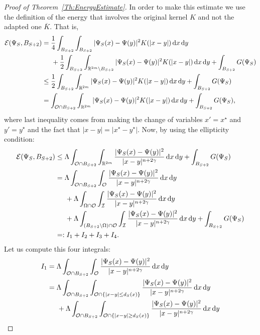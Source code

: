 \begin{proof}[Proof of Theorem~\ref{Th:EnergyEstimate}]
In order to make this estimate we use the definition of the energy that involves the original kernel $K$ and not the adapted one $\overline{K}$. That is,
\begin{align*}
\mathcal{E}(\Psi_S,B_{S+2}) &= \frac{1}{4} \int_{B_{S+2}} \int_{B_{S+2}} |\Psi_S(x)-\Psi(y)|^2K(|x-y|) \,\mathrm{d} x\,\mathrm{d} y \\
&\hspace{5mm} +\frac{1}{2} \int_{B_{S+2}} \int_{\mathbb{R}^{2m} \setminus B_{S+2}} |\Psi_S(x)-\Psi(y)|^2K(|x-y|) \,\mathrm{d} x\,\mathrm{d} y + \int_{B_{S+2}} G(\Psi_S) \\
&\leq \frac{1}{2} \int_{B_{S+2}} \int_{\mathbb{R}^{2m}} |\Psi_S(x)-\Psi(y)|^2K(|x-y|) \,\mathrm{d} x\,\mathrm{d} y + \int_{B_{S+2}} G(\Psi_S) \\
&= \int_{\mathcal{O} \cap B_{S+2}} \int_{\mathbb{R}^{2m}} |\Psi_S(x)-\Psi(y)|^2K(|x-y|) \,\mathrm{d} x\,\mathrm{d} y + \int_{B_{S+2}} G(\Psi_S),
\end{align*}
where last inequality comes from making the change of variables $x'=x^\star$ and $y'=y^\star$ and the fact that $|x-y|=|x^\star-y^\star|$. Now, by using the ellipticity condition:
\begin{align*}
\mathcal{E}(\Psi_S,B_{S+2}) &\leq \Lambda \int_{\mathcal{O} \cap B_{S+2}} \int_{\mathbb{R}^{2m}} \frac{|\Psi_S(x)-\Psi(y)|^2}{|x-y|^{n+2\gamma}} \,\mathrm{d} x\,\mathrm{d} y + \int_{B_{S+2}} G(\Psi_S)\\
&= \Lambda \int_{\mathcal{O} \cap B_{S+2}} \int_{\mathcal{O}} \frac{|\Psi_S(x)-\Psi(y)|^2}{|x-y|^{n+2\gamma}} \,\mathrm{d} x\,\mathrm{d} y \\
&\hspace{5mm} + \Lambda \int_{\Omega \cap \mathcal{O}} \int_{\mathcal{I}} \frac{|\Psi_S(x)-\Psi(y)|^2}{|x-y|^{n+2\gamma}} \,\mathrm{d} x\,\mathrm{d} y \\
&\hspace{5mm} + \Lambda \int_{(B_{S+2}\setminus \Omega) \cap \mathcal{O}} \int_{\mathcal{I}} \frac{|\Psi_S(x)-\Psi(y)|^2}{|x-y|^{n+2\gamma}} \,\mathrm{d} x\,\mathrm{d} y + \int_{B_{S+2}} G(\Psi_S) \\
&=:I_1+I_2+I_3+I_4.
\end{align*}
Let us compute this four integrals:
\begin{align*}
I_1 &= \Lambda \int_{\ocal \cap B_{S+2}} \int_{\ocal} \frac{|\Psi_S(x)-\Psi(y)|^2}{|x-y|^{n+2\s}} \d x\d y\\
&= \Lambda \int_{\ocal \cap B_{S+2}} \int_{\ocal\cap\{|x-y|\leq d_S(x)\}} \frac{|\Psi_S(x)-\Psi(y)|^2}{|x-y|^{n+2\s}} \d x\d y\\
&\hspace{5mm} + \Lambda \int_{\ocal \cap B_{S+2}} \int_{\ocal\cap\{|x-y|\geq d_S(x)\}} \frac{|\Psi_S(x)-\Psi(y)|^2}{|x-y|^{n+2\s}} \d x\d y\\

\end{align*}
\end{proof}
